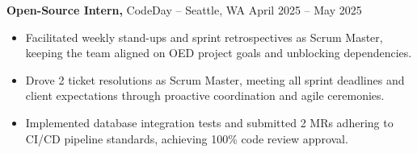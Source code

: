 \documentclass[11pt]{article}       %
\begin{document}

\textbf{Open-Source Intern,} {CodeDay} -- Seattle, WA \hfill April 2025 -- May 2025 \\
\vspace{-9pt}
\begin{itemize}
  \item Facilitated weekly stand-ups and sprint retrospectives as Scrum Master, keeping the team aligned on OED project goals and unblocking dependencies.
  \item Drove 2 ticket resolutions as Scrum Master, meeting all sprint deadlines and client expectations through proactive coordination and agile ceremonies.
  \item Implemented database integration tests and submitted 2 MRs adhering to CI/CD pipeline standards, achieving 100\% code review approval.
\end{itemize}

\end{document}
